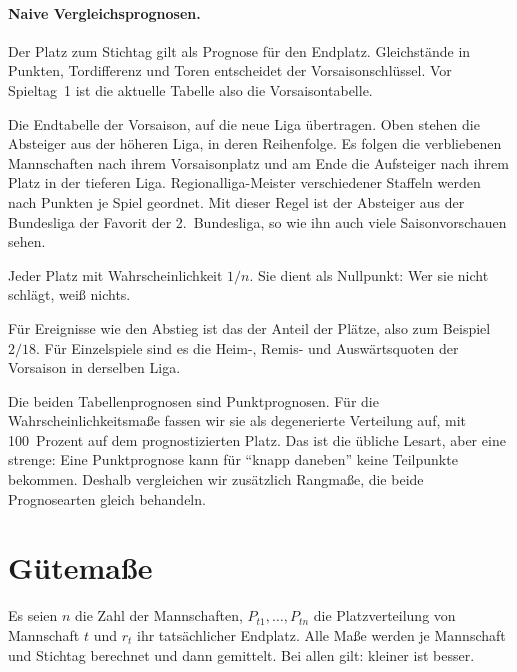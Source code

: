 \documentclass[11pt,a4paper,parskip=half,numbers=noenddot]{scrartcl}
\begin{document}
\paragraph{Naive Vergleichsprognosen.}
\begin{description}[font=\sffamily\bfseries\small]
  \item[Aktuelle Tabelle] Der Platz zum Stichtag gilt als Prognose für den
        Endplatz. Gleichstände in Punkten, Tordifferenz und Toren entscheidet
        der Vorsaisonschlüssel. Vor Spieltag~1 ist die aktuelle Tabelle also
        die Vorsaisontabelle.
  \item[Vorsaison] Die Endtabelle der Vorsaison, auf die neue Liga
        übertragen. Oben stehen die Absteiger aus der höheren Liga, in deren
        Reihenfolge. Es folgen die verbliebenen Mannschaften nach ihrem
        Vorsaisonplatz und am Ende die Aufsteiger nach ihrem Platz in der
        tieferen Liga. Regionalliga-Meister verschiedener Staffeln werden
        nach Punkten je Spiel geordnet. Mit dieser Regel ist der Absteiger
        aus der Bundesliga der Favorit der 2.~Bundesliga, so wie ihn auch
        viele Saisonvorschauen sehen.
  \item[Gleichverteilung] Jeder Platz mit Wahrscheinlichkeit $1/n$. Sie
        dient als Nullpunkt: Wer sie nicht schlägt, weiß nichts.
  \item[Klimatologie] Für Ereignisse wie den Abstieg ist das der Anteil der
        Plätze, also zum Beispiel $2/18$. Für Einzelspiele sind es die
        Heim-, Remis- und Auswärtsquoten der Vorsaison in derselben Liga.
\end{description}
Die beiden Tabellenprognosen sind Punktprognosen. Für die
Wahrscheinlichkeitsmaße fassen wir sie als degenerierte Verteilung auf, mit
100~Prozent auf dem prognostizierten Platz. Das ist die übliche Lesart, aber
eine strenge: Eine Punktprognose kann für \enquote{knapp daneben} keine
Teilpunkte bekommen. Deshalb vergleichen wir zusätzlich Rangmaße, die beide
Prognosearten gleich behandeln.

\section{Gütemaße}\label{sec:masse}

Es seien $n$ die Zahl der Mannschaften, $P_{t1},\dots,P_{tn}$ die
Platzverteilung von Mannschaft $t$ und $r_t$ ihr tatsächlicher Endplatz. Alle
Maße werden je Mannschaft und Stichtag berechnet und dann gemittelt. Bei allen
gilt: kleiner ist besser.
\end{document}
